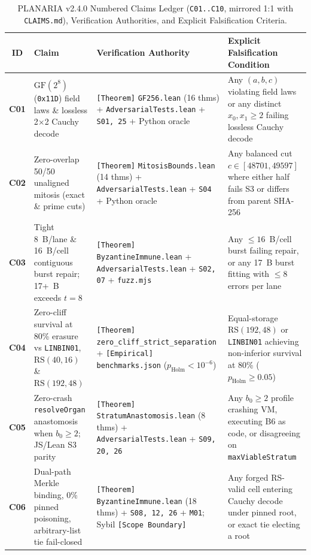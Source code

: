 \documentclass[11pt,letterpaper]{article}
\theoremstyle{remark}
\begin{document}
\begin{table}[ht]
\centering
\caption{PLANARIA v2.4.0 Numbered Claims Ledger (\texttt{C01..C10}, mirrored 1:1 with \texttt{CLAIMS.md}), Verification Authorities, and Explicit Falsification Criteria.}
\label{tab:claims}
\scriptsize
\setlength{\tabcolsep}{3.5pt}
\begin{tabular}{@{} c >{\raggedright\arraybackslash}p{4.3cm} >{\raggedright\arraybackslash}p{4.8cm} >{\raggedright\arraybackslash}p{5.5cm} @{}}
\toprule
\textbf{ID} & \textbf{Claim} & \textbf{Verification Authority} & \textbf{Explicit Falsification Condition} \\
\midrule
\textbf{C01} & $\mathrm{GF}(2^8)$ (\texttt{0x11D}) field laws \& lossless 2$\times$2 Cauchy decode & \texttt{[Theorem]} \texttt{GF256.lean} (16 thms) + \texttt{AdversarialTests.lean} + \texttt{S01, 25} + Python oracle & Any $(a,b,c)$ violating field laws or any distinct $x_0,x_1\ge 2$ failing lossless Cauchy decode \\
\textbf{C02} & Zero-overlap 50/50 unaligned mitosis (exact \& prime cuts) & \texttt{[Theorem]} \texttt{MitosisBounds.lean} (14 thms) + \texttt{AdversarialTests.lean} + \texttt{S04} + Python oracle & Any balanced cut $c\in[48701,49597]$ where either half fails S3 or differs from parent SHA-256 \\
\textbf{C03} & Tight 8~B/lane \& 16~B/cell contiguous burst repair; 17+~B exceeds $t=8$ & \texttt{[Theorem]} \texttt{ByzantineImmune.lean} + \texttt{AdversarialTests.lean} + \texttt{S02, 07} + \texttt{fuzz.mjs} & Any $\le 16$~B/cell burst failing repair, or any 17~B burst fitting with $\le 8$ errors per lane \\
\textbf{C04} & Zero-cliff survival at 80\% erasure vs \texttt{LINBIN01}, $\mathrm{RS}(40,16)$ \& $\mathrm{RS}(192,48)$ & \texttt{[Theorem]} \texttt{zero\_\allowbreak cliff\_\allowbreak strict\_\allowbreak separation} + \texttt{[Empirical]} \texttt{benchmarks.json} ($p_{\text{Holm}}<10^{-6}$) & Equal-storage $\mathrm{RS}(192,48)$ or \texttt{LINBIN01} achieving non-inferior survival at 80\% ($p_{\text{Holm}}\ge 0.05$) \\
\textbf{C05} & Zero-crash \texttt{resolveOrgan} anastomosis when $b_0\ge 2$; JS/Lean S3 parity & \texttt{[Theorem]} \texttt{StratumAnastomosis.lean} (8 thms) + \texttt{AdversarialTests.lean} + \texttt{S09, 20, 26} & Any $b_0\ge 2$ profile crashing VM, executing B6 as code, or disagreeing on \texttt{maxViableStratum} \\
\textbf{C06} & Dual-path Merkle binding, 0\% pinned poisoning, arbitrary-list tie fail-closed & \texttt{[Theorem]} \texttt{ByzantineImmune.lean} (18 thms) + \texttt{S08, 12, 26} + \texttt{M01}; Sybil \texttt{[Scope Boundary]} & Any forged RS-valid cell entering Cauchy decode under pinned root, or exact tie electing a root \\

\end{tabular}
\end{table}
\end{document}
